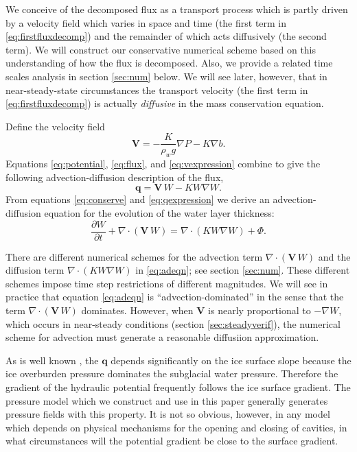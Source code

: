 \documentclass[11pt,final]{amsart}%
\newcommand\bV{\mathbf{V}}
\newcommand\bq{\mathbf{q}}
\newcommand{\Div}{\nabla\cdot}
\newcommand{\grad}{\nabla}
\begin{document}
We conceive of the decomposed flux as a transport process which is partly driven by a velocity field which varies in space and time (the first term in \eqref{eq:firstfluxdecomp}) and the remainder of which acts diffusively (the second term).  We will construct our conservative numerical scheme based on this understanding of how the flux is decomposed.  Also, we provide a related time scales analysis in section \ref{sec:num} below.  We will see later, however, that in near-steady-state circumstances the transport velocity (the first term in \eqref{eq:firstfluxdecomp}) is actually \emph{diffusive} in the mass conservation equation.

Define the velocity field
\begin{equation} \label{eq:vexpression}
  \bV = - \frac{K}{\rho_w g} \grad P - K \grad b.
\end{equation}
Equations \eqref{eq:potential}, \eqref{eq:flux}, and \eqref{eq:vexpression} combine to give the following advection-diffusion description of the flux,
\begin{equation} \label{eq:qexpression}
  \bq = \bV\, W - K W \grad W.
\end{equation}
From equations \eqref{eq:conserve} and \eqref{eq:qexpression} we derive an advection-diffusion equation \citep{HundsdorferVerwer2010} for the evolution of the water layer thickness:
\begin{equation} \label{eq:adeqn}
  \frac{\partial W}{\partial t} + \Div\left(\bV\, W\right) = \Div \left(K W \grad W\right) + \Phi.
\end{equation}

There are different numerical schemes for the advection term $\Div\left(\bV\, W\right)$ and the diffusion term $\Div \left(K W \grad W\right)$ in \eqref{eq:adeqn}; see section \ref{sec:num}.  These different schemes impose time step restrictions of different magnitudes.  We will see in practice that equation \eqref{eq:adeqn} is ``advection-dominated'' in the sense that the term $\Div\left(\bV\, W\right)$ dominates.  However, when  $\bV$ is nearly proportional to $-\grad W$, which occurs in near-steady conditions (section \ref{sec:steadyverif}), the numerical scheme for advection must generate a reasonable diffusiion approximation.

As is well known \citep{Clarke05}, the $\bq$ depends significantly on the ice surface slope because the ice overburden pressure dominates the subglacial water pressure.  Therefore the gradient of the hydraulic potential frequently follows the ice surface gradient.  The pressure model which we construct and use in this paper generally generates pressure fields with this property.  It is not so obvious, however, in any model which depends on physical mechanisms for the opening and closing of cavities, in what circumstances will the potential gradient be close to the surface gradient.
\end{document}
